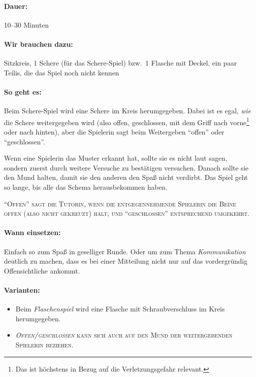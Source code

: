 \paragraph{Dauer:} 10--30 Minuten
\paragraph{Wir brauchen dazu:} Sitzkreis, 1 Schere (für das Schere-Spiel) bzw.~1 Flasche mit Deckel, ein paar Teilis, die das Spiel noch nicht kennen
\paragraph{So geht es:} Beim Schere-Spiel wird eine Schere im Kreis herumgegeben. Dabei ist es egal, \emph{wie} die Schere weitergegeben wird (also offen, geschlossen, mit dem Griff nach vorne\footnote{Das ist höchstens in Bezug auf die Verletzungsgefahr relevant.} oder nach hinten), aber die Spielerin sagt beim Weitergeben "`offen"' oder "`geschlossen"'.

Wenn eine Spielerin das Muster erkannt hat, sollte sie es nicht laut sagen, sondern zuerst durch weitere Versuche zu bestätigen versuchen. Danach sollte sie den Mund halten, damit sie den anderen den Spaß nicht verdirbt. Das Spiel geht so lange, bis alle das Schema herausbekommen haben.

 \textsc{"`Offen"' sagt die Tutorin, wenn die entgegennehmende Spielerin die Beine offen (also nicht gekreuzt) hält, und "`geschlossen"' entsprechend umgekehrt.}

\paragraph{Wann einsetzen:} Einfach so zum Spaß in geselliger Runde. Oder um zum Thema \emph{Kommunikation} deutlich zu machen, dass es bei einer Mitteilung nicht nur auf das vordergründig Offensichtliche ankommt.
\paragraph{Varianten:} \begin{itemize}
		\item Beim \emph{Flaschenspiel} wird eine Flasche mit Schraubverschluss im Kreis herumgegeben.
		\item \textsc{\emph{Offen/geschlossen} kann sich auch auf den Mund der weitergebenden Spielerin beziehen.}
	\end{itemize}

